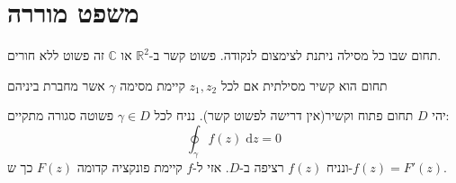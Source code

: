 \documentclass{tstextbook}
\begin{document}
\section{משפט מוררה}

\begin{definition}
תחום שבו כל מסילה ניתנת לצימצום לנקודה. פשוט קשר ב-\(\mathbb{R}^2\) או \(\mathbb{C}\) זה פשוט ללא חורים.

\end{definition}
\begin{definition}
תחום הוא קשיר מסילתית אם לכל \(z_{1},z_{2}\) קיימת מסימה \(\gamma\) אשר מחברת ביניהם

\end{definition}
\begin{theorem}[ מוררה]
יהי \(D\) תחום פתוח וקשיר(אין דרישה לפשוט קשר). נניח לכל \(\gamma \in D\) פשוטה סגורה מתקיים:
$$\oint_{\gamma} f(z)\;\mathrm{d}z=0$$
ונניח \(f(z)\) רציפה ב-\(D\). אזי ל-\(f\) קיימת פונקציה קדומה \(F(z)\) כך ש-\(f(z)=F'(z)\).

\end{theorem}
\end{document}
